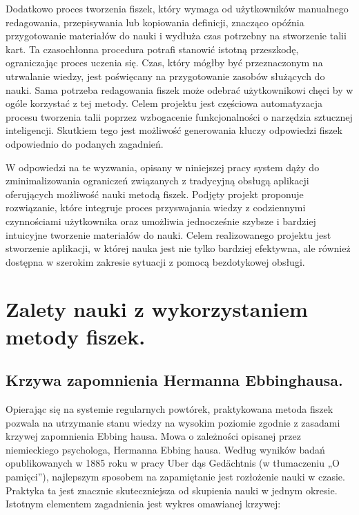Dodatkowo proces tworzenia fiszek, który wymaga od użytkowników manualnego redagowania, przepisywania lub kopiowania definicji, znacząco opóźnia przygotowanie materiałów do nauki i wydłuża czas potrzebny na stworzenie talii kart. Ta czasochłonna procedura potrafi stanowić istotną przeszkodę, ograniczając proces uczenia się. Czas, który mógłby być przeznaczonym na utrwalanie wiedzy, jest poświęcany na przygotowanie zasobów służących do nauki. Sama potrzeba redagowania fiszek może odebrać użytkownikowi chęci by w ogóle korzystać z tej metody. Celem projektu jest częściowa automatyzacja procesu tworzenia talii poprzez wzbogacenie funkcjonalności o narzędzia sztucznej inteligencji. Skutkiem tego jest możliwość generowania kluczy odpowiedzi fiszek odpowiednio do podanych zagadnień.

W odpowiedzi na te wyzwania, opisany w niniejszej pracy system dąży do zminimalizowania ograniczeń związanych z tradycyjną obsługą aplikacji oferujących możliwość nauki metodą fiszek. Podjęty projekt proponuje rozwiązanie, które integruje proces przyswajania wiedzy z codziennymi czynnościami użytkownika oraz umożliwia jednocześnie szybsze i bardziej intuicyjne tworzenie materiałów do nauki. Celem realizowanego projektu jest stworzenie aplikacji, w której nauka jest nie tylko bardziej efektywna, ale również dostępna w szerokim zakresie sytuacji z pomocą bezdotykowej obsługi.

\section{Zalety nauki z wykorzystaniem metody fiszek.}

\subsection{Krzywa zapomnienia Hermanna Ebbinghausa.}

Opierając się na systemie regularnych powtórek, praktykowana metoda fiszek pozwala na utrzymanie stanu wiedzy na wysokim poziomie zgodnie z zasadami krzywej zapomnienia Ebbing hausa. Mowa o zależności opisanej przez niemieckiego psychologa, Hermanna Ebbing hausa. Według wyników badań opublikowanych w 1885 roku w pracy \cite{1} Uber dąs Gedächtnis (w tłumaczeniu „O pamięci”), najlepszym sposobem na zapamiętanie jest rozłożenie nauki w czasie. Praktyka ta jest znacznie skuteczniejsza od skupienia nauki w jednym okresie. Istotnym elementem zagadnienia jest wykres omawianej krzywej:



